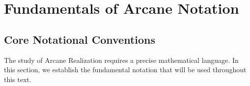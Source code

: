 
\chapter{Fundamentals of Arcane Notation}

\nochapterthumbnail

\section{Core Notational Conventions}

The study of Arcane Realization requires a precise mathematical language. In this section, we establish the fundamental notation that will be used throughout this text.

